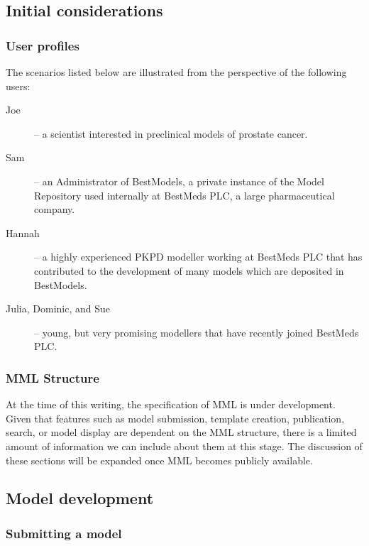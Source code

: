 \subsection{Initial considerations}
\subsubsection{User profiles}
\label{userProfiles}
The scenarios listed below are illustrated from the perspective of the following users:
\begin{description}
    \item[Joe] -- a scientist interested in preclinical models of prostate cancer.
    \item[Sam] -- an Administrator of BestModels, a private instance of the \ddmore Model Repository used internally at BestMeds PLC, a large pharmaceutical company.
    \item[Hannah] -- a highly experienced PKPD modeller working at BestMeds PLC that has contributed to the development of many models which are deposited in BestModels.
    \item[Julia, Dominic, and Sue] -- young, but very promising modellers that have recently joined BestMeds PLC.
\end{description}

\subsubsection{MML Structure}
At the time of this writing, the specification of MML is under development. Given that features such as model submission, template creation, publication, search, or model display are dependent on the MML structure, there is a limited amount of information we can include about them at this stage. The discussion of these sections will be expanded once MML becomes publicly available.

\subsection{Model development}

\subsubsection{Submitting a model}


